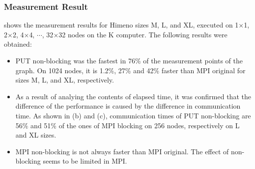 \subsubsection{Measurement Result}

 shows the measurement results for Himeno sizes M, L, and XL,
executed on 1$\times$1, 2$\times$2, 4$\times$4, $\cdots$, 32$\times$32 nodes on the
K computer. The following results were obtained:
\begin{itemize}
\item
PUT non-blocking was the fastest in 76\% of the measurement points of the graph. 
On 1024 nodes, it is 1.2\%, 27\% and 42\% faster than MPI original for sizes M, L, 
and XL, respectively.

\item
As a result of analying the contents of elapsed time, it was confirmed that the
difference of the performance is caused by the difference in communication
time. As shown in (b) and (c), communication times of PUT non-blocking are
56\% and 51\% of the ones of MPI blocking on 256 nodes, respectively on L and 
XL sizes.

\item
MPI non-blocking is not always faster than MPI original. The effect of 
non-blocking seems to be limited in MPI.

\end{itemize}

